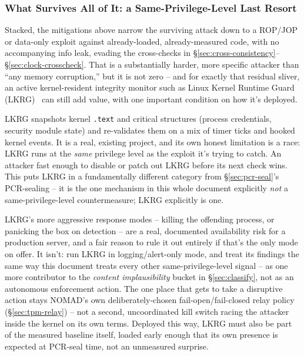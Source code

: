 \documentclass[11pt,a4paper]{article}
\begin{document}
\subsubsection{What Survives All of It: a Same-Privilege-Level Last Resort}
\label{sec:lkrg-report-only}

Stacked, the mitigations above narrow the surviving attack down to a
ROP/JOP or data-only exploit against already-loaded, already-measured
code, with no accompanying info leak, evading the cross-checks in
\S\ref{sec:cross-consistency}--\S\ref{sec:clock-crosscheck}. That is a
substantially harder, more specific attacker than ``any memory
corruption,'' but it is not zero -- and for exactly that residual
sliver, an active kernel-resident integrity monitor such as Linux
Kernel Runtime Guard (LKRG)~\cite{lkrg} can still add value, with one important
condition on how it's deployed.

LKRG snapshots kernel \texttt{.text} and critical structures (process
credentials, security module state) and re-validates them on a mix of
timer ticks and hooked kernel events. It is a real, existing project,
and its own honest limitation is a race: LKRG runs at the \emph{same}
privilege level as the exploit it's trying to catch. An attacker fast
enough to disable or patch out LKRG before its next check wins. This
puts LKRG in a fundamentally different category from
\S\ref{sec:pcr-seal}'s PCR-sealing -- it is the one mechanism in this
whole document explicitly \emph{not} a same-privilege-level
countermeasure; LKRG explicitly is one.

\begin{notebox}
LKRG's more aggressive response modes -- killing the offending process,
or panicking the box on detection -- are a real, documented
availability risk for a production server, and a fair reason to rule
it out entirely if that's the only mode on offer. It isn't: run LKRG in
logging/alert-only mode, and treat its findings the same way this
document treats every other same-privilege-level signal -- as one more
contributor to the \emph{content implausibility} bucket in
\S\ref{sec:classify}, not as an autonomous enforcement action. The one
place that gets to take a disruptive action stays NOMAD's own
deliberately-chosen fail-open/fail-closed relay policy
(\S\ref{sec:tpm-relay}) -- not a second, uncoordinated kill switch
racing the attacker inside the kernel on its own terms. Deployed this
way, LKRG must also be part of the measured baseline itself, loaded
early enough that its own presence is expected at PCR-seal time, not
an unmeasured surprise.
\end{notebox}
\end{document}
